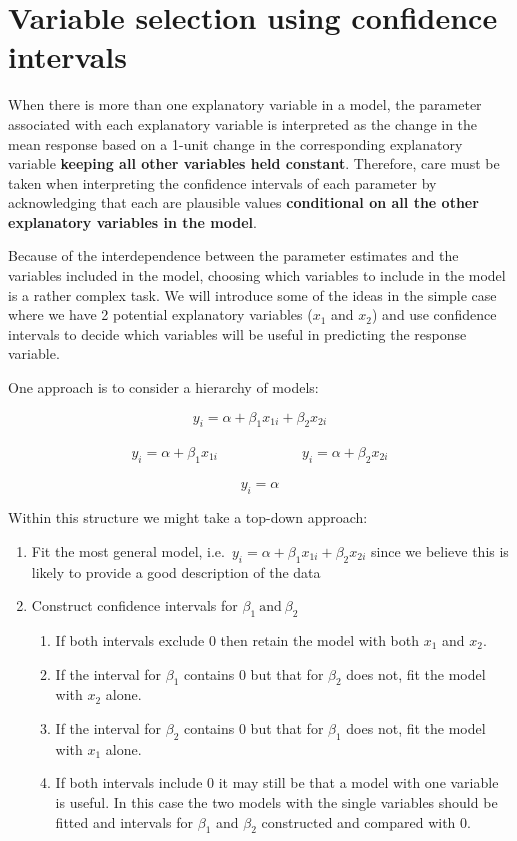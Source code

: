 \documentclass[
  letterpaper,
  DIV=11,
  numbers=noendperiod]{scrartcl}
\providecommand{\tightlist}{%
  \setlength{\itemsep}{0pt}\setlength{\parskip}{0pt}}\usepackage{longtable,booktabs,array}
\begin{document}
\section{Variable selection using confidence
intervals}\label{variable-selection-using-confidence-intervals}

When there is more than one explanatory variable in a model, the
parameter associated with each explanatory variable is interpreted as
the change in the mean response based on a 1-unit change in the
corresponding explanatory variable \textbf{keeping all other variables
held constant}. Therefore, care must be taken when interpreting the
confidence intervals of each parameter by acknowledging that each are
plausible values \textbf{conditional on all the other explanatory
variables in the model}.

Because of the interdependence between the parameter estimates and the
variables included in the model, choosing which variables to include in
the model is a rather complex task. We will introduce some of the ideas
in the simple case where we have 2 potential explanatory variables
(\(x_1\) and \(x_2\)) and use confidence intervals to decide which
variables will be useful in predicting the response variable.

One approach is to consider a hierarchy of models:

\[y_i = \alpha + \beta_1 x_{1i} + \beta_2 x_{2i}\]\\
\[y_i = \alpha + \beta_1 x_{1i} \qquad \qquad \qquad y_i = \alpha + \beta_2 x_{2i}\]\\
\[y_i = \alpha\]

Within this structure we might take a top-down approach:

\begin{enumerate}
\def\labelenumi{\arabic{enumi}.}
\tightlist
\item
  Fit the most general model,
  i.e.~\(y_i = \alpha + \beta_1 x_{1i} + \beta_2 x_{2i}\) since we
  believe this is likely to provide a good description of the data
\item
  Construct confidence intervals for \(\beta_1 ~\textrm{and} ~\beta_2\)

  \begin{enumerate}
  \def\labelenumii{(\alph{enumii})}
  \tightlist
  \item
    If both intervals exclude 0 then retain the model with both \(x_1\)
    and \(x_2\).
  \item
    If the interval for \(\beta_1\) contains 0 but that for \(\beta_2\)
    does not, fit the model with \(x_2\) alone.
  \item
    If the interval for \(\beta_2\) contains 0 but that for \(\beta_1\)
    does not, fit the model with \(x_1\) alone.
  \item
    If both intervals include 0 it may still be that a model with one
    variable is useful. In this case the two models with the single
    variables should be fitted and intervals for \(\beta_1\) and
    \(\beta_2\) constructed and compared with 0.
  \end{enumerate}
\end{enumerate}
\end{document}
